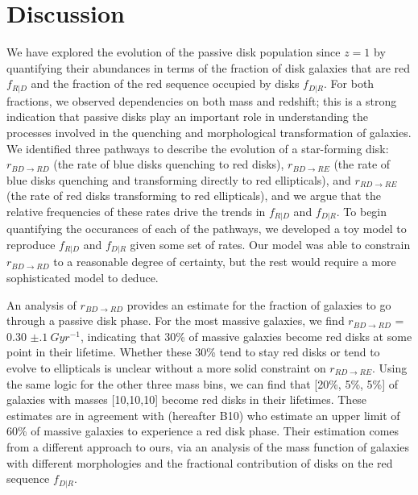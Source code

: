 \documentclass[useAMS,usenatbib]{mn2e}
\begin{document}


\section{Discussion}
\label{sec:Discussion}

We have explored the evolution of the passive disk population since $z=1$ by quantifying their abundances in terms of the fraction of disk galaxies that are red $f_{R|D}$ and the fraction of the red sequence occupied by disks $f_{D|R}$. For both fractions, we observed dependencies on both mass and redshift; this is a strong indication that passive disks play an important role in understanding the processes involved in the quenching and morphological transformation of galaxies. We identified three pathways to describe the evolution of a star-forming disk: $r_{BD \rightarrow RD}$ (the rate of blue disks quenching to red disks), $r_{BD \rightarrow RE}$ (the rate of blue disks quenching and transforming directly to red ellipticals), and $r_{RD \rightarrow RE}$ (the rate of red disks transforming to red ellipticals), and we argue that the relative frequencies of these rates drive the trends in $f_{R|D}$ and $f_{D|R}$. To begin quantifying the occurances of each of the pathways, we developed a toy model to reproduce $f_{R|D}$ and $f_{D|R}$ given some set of rates. Our model was able to constrain $r_{BD \rightarrow RD}$ to a reasonable degree of certainty, but the rest would require a more sophisticated model to deduce.

An analysis of $r_{BD \rightarrow RD}$ provides an estimate for the fraction of galaxies to go through a passive disk phase. For the most massive galaxies, we find $r_{BD \rightarrow RD}$ = 0.30 $\pm .1~Gyr^{-1}$, indicating that 30\% of massive galaxies become red disks at some point in their lifetime. Whether these 30\% tend to stay red disks or tend to evolve to ellipticals is unclear without a more solid constraint on $r_{RD \rightarrow RE}$. Using the same logic for the other three mass bins, we can find that [20\%, 5\%, 5\%] of galaxies with masses [10,10,10] become red disks in their lifetimes. These estimates are in agreement with \citet{Bundy2010} (hereafter B10) who estimate an upper limit of 60\% of massive galaxies to experience a red disk phase. Their estimation comes from a different approach to ours, via an analysis of the mass function of galaxies with different morphologies and the fractional contribution of disks on the red sequence $f_{D|R}$.  
\end{document}
